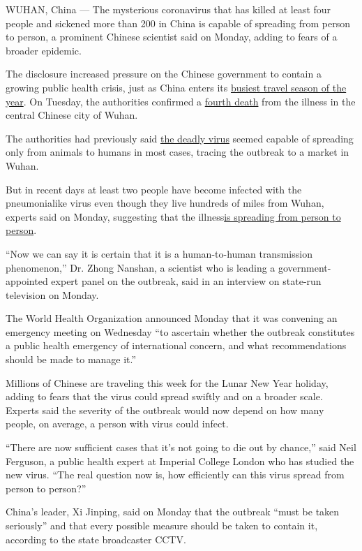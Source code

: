 WUHAN, China --- The mysterious coronavirus that has killed at least
four people and sickened more than 200 in China is capable of spreading
from person to person, a prominent Chinese scientist said on Monday,
adding to fears of a broader epidemic.

The disclosure increased pressure on the Chinese government to contain a
growing public health crisis, just as China enters its
\href{https://www.nytimes.com/2020/01/22/world/asia/china-coronavirus-travel.html}{busiest
travel season of the year}. On Tuesday, the authorities confirmed a
\href{http://wjw.wuhan.gov.cn/front/web/showDetail/2020012109083}{fourth
death} from the illness in the central Chinese city of Wuhan.

The authorities had previously said
\href{https://www.nytimes.com/2020/01/21/health/what-is-coronavirus.html}{the
deadly virus} seemed capable of spreading only from animals to humans in
most cases, tracing the outbreak to a market in Wuhan.

But in recent days at least two people have become infected with the
pneumonialike virus even though they live hundreds of miles from Wuhan,
experts said on Monday, suggesting that the
illness\href{https://www.nytimes.com/2020/02/19/world/asia/china-coronavirus.html}{is
spreading from person to person}.

``Now we can say it is certain that it is a human-to-human transmission
phenomenon,'' Dr. Zhong Nanshan, a scientist who is leading a
government-appointed expert panel on the outbreak, said in an interview
on state-run television on Monday.

The World Health Organization announced Monday that it was convening an
emergency meeting on Wednesday ``to ascertain whether the outbreak
constitutes a public health emergency of international concern, and what
recommendations should be made to manage it.''

Millions of Chinese are traveling this week for the Lunar New Year
holiday, adding to fears that the virus could spread swiftly and on a
broader scale. Experts said the severity of the outbreak would now
depend on how many people, on average, a person with virus could infect.

``There are now sufficient cases that it's not going to die out by
chance,'' said Neil Ferguson, a public health expert at Imperial College
London who has studied the new virus. ``The real question now is, how
efficiently can this virus spread from person to person?''

China's leader, Xi Jinping, said on Monday that the outbreak ``must be
taken seriously'' and that every possible measure should be taken to
contain it, according to the state broadcaster CCTV.


